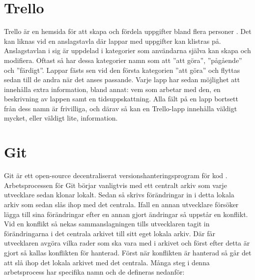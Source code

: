 \section{Trello}
Trello är en hemsida för att skapa och fördela uppgifter bland flera personer \cite{Trello}. Det kan liknas vid en anslagstavla där lappar med uppgifter kan klistras på. Anslagstavlan i sig är uppdelad i kategorier som användarna själva kan skapa och modifiera. Oftast så har dessa kategorier namn som att ''att göra'', ''pågående'' och ''färdigt''. Lappar fästs sen vid den första kategorien ''att göra'' och flyttas sedan till de andra när det anses passande. Varje lapp har sedan möjlighet att innehålla extra information, bland annat: vem som arbetar med den, en beskrivning av lappen samt en tidsuppskattning. Alla fält på en lapp bortsett från dess namn är frivilliga, och därav så kan en Trello-lapp innehålla väldigt mycket, eller väldigt lite, information.

\section{Git}
Git är ett open-source decentraliserat versionshanteringsprogram för kod \cite{Git}. Arbetsprocessen för Git börjar vanligtvis med ett centralt arkiv som varje utvecklare sedan klonar lokalt. Sedan så skrivs förändringar in i detta lokala arkiv som sedan slås ihop med det centrala. Ifall en annan utvecklare försöker lägga till sina förändringar efter en annan gjort ändringar så uppstår en konflikt. Vid en konflikt så nekas sammanslagningen tills utvecklaren tagit in förändringarna i det centrala arkivet till sitt eget lokala arkiv. Där får utvecklaren avgöra vilka rader som ska vara med i arkivet och först efter detta är gjort så kallas konflikten för hanterad. Först när konflikten är hanterad så går det att slå ihop det lokala arkivet med det centrala. Många steg i denna arbetsprocess har specifika namn och de defineras nedanför:

